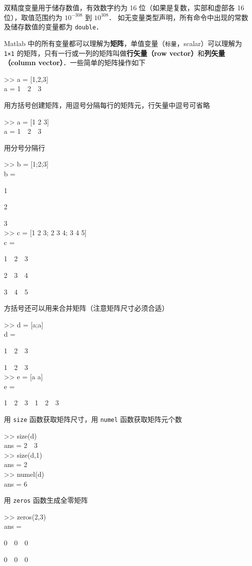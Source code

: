 双精度变量用于储存数值，有效数字约为 16 位（如果是复数，实部和虚部各 16 位），取值范围约为 $10^{-308}$ 到 $10^{308}$． 如无变量类型声明，所有命令中出现的常数及储存数值的变量都为 \texttt{double}．

Matlab 中的所有变量都可以理解为\textbf{矩阵}，单值变量（\texttt{标量}，scalar）可以理解为 \texttt{1×1} 的矩阵，只有一行或一列的矩阵叫做\textbf{行矢量（row vector）}和\textbf{列矢量（column vector）}．一些简单的矩阵操作如下
\begin{Command}
>> a = [1,2,3] \\
a = 1\ \ 2\ \ 3
\end{Command}
用方括号创建矩阵，用逗号分隔每行的矩阵元，行矢量中逗号可省略
\begin{Command}
>> a = [1 2 3] \\
a = 1\ \ 2\ \ 3
\end{Command}
用分号分隔行
\begin{Command}
>> b = [1;2;3] \\
b = \par
1 \par
2 \par
3 \\
>> c = [1 2 3; 2 3 4; 3 4 5]\\
c = \par
1\ \ 2\ \ 3 \par
2\ \ 3\ \ 4 \par
3\ \ 4\ \ 5
\end{Command}
方括号还可以用来合并矩阵（注意矩阵尺寸必须合适）
\begin{Command}
>> d = [a;a] \\
d = \par
1\ \ 2\ \ 3 \par
1\ \ 2\ \ 3 \\
>> e = [a a] \\
e = \par
1\ \ 2\ \ 3\ \ 1\ \ 2\ \ 3
\end{Command}
用 \texttt{size} 函数获取矩阵尺寸，用 \texttt{numel} 函数获取矩阵元个数
\begin{Command}
>> size(d) \\
ans = 2\ \ 3 \\
>> size(d,1) \\
ans = 2 \\
>> numel(d) \\
ans = 6
\end{Command}
用 \texttt{zeros} 函数生成全零矩阵
\begin{Command}
>> zeros(2,3) \\
ans = \par
0\ \ 0\ \ 0 \par
0\ \ 0\ \ 0
\end{Command}
